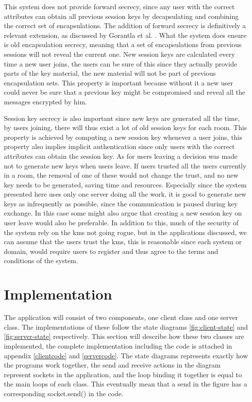 This system does not provide forward secrecy, since any user with the correct attributes can obtain all previous session keys by decapsulating and combining the correct set of encapsulations. The addition of forward secrecy is definitively a relevant extension, as discussed by Gorantla et al. \cite{gorantla2010attribute}. What the system does ensure is old encapsulation secrecy, meaning that a set of encapsulations from previous sessions will not reveal the current one. New session keys are calculated every time a new user joins, the users can be sure of this since they actually provide parts of the key material, the new material will not be part of previous encapsulation sets. This property is important because without it a new user could never be sure that a previous key might be compromised and reveal all the messages encrypted by him. 
\par Session key secrecy is also important since new keys are generated all the time, by users joining, there will thus exist a lot of old session keys for each room. This property is achieved by computing a new session key whenever a user joins, this property also implies implicit authentication since only users with the correct attributes can obtain the session key. As for users leaving a decision was made not to generate new keys when users leave. If users trusted all the users currently in a room, the removal of one of these would not change the trust, and no new key needs to be generated, saving time and resources. Especially since the system presented here uses only one server doing all the work, it is good to generate new keys as infrequently as possible, since the communication is paused during key exchange. In this case some might also argue that creating a new session key on user leave would also be preferable. In addition to this, much of the security of the system rely on the \gls{kms} not going rogue, but in the applications discussed, we can assume that the users trust the \gls{kms}, this is reasonable since each system or domain, would require users to register and thus agree to the terms and conditions of the system.





\section{Implementation}
The application will consist of two components, one client class and one server class. The implementations of these follow the state diagrams \ref{fig:client-state} and \ref{fig:server-state} respectively. This section will describe how these two classes are implemented, the complete implementation including the code is attached in appendix \ref{clientcode} and \ref{servercode}. The state diagrams represents exactly how the programs work together, the send and receive actions in the diagram represent sockets in the application, and the loop binding it together is equal to the main loops of each class. This eventually mean that a send in the figure has a corresponding socket.send() in the code.

